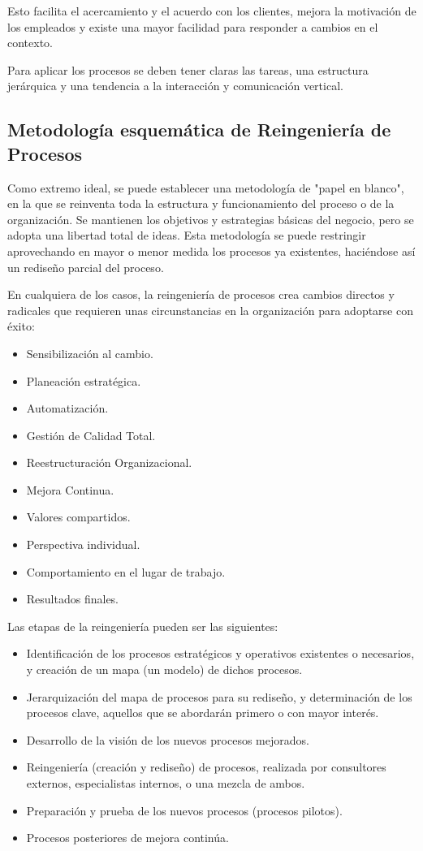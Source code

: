 Esto facilita el acercamiento y el acuerdo con los clientes, mejora la motivación de los empleados y existe
una mayor facilidad para responder a cambios en el contexto.

Para aplicar los procesos se deben tener claras las tareas, una estructura jerárquica y una tendencia a la
interacción y comunicación vertical.

\subsection*{Metodología esquemática de Reingeniería de Procesos}

Como extremo ideal, se puede establecer una metodología de "papel en blanco", en la que se reinventa toda la
estructura y funcionamiento del proceso o de la organización. Se mantienen los objetivos y estrategias básicas
del negocio, pero se adopta una libertad total de ideas. Esta metodología se puede restringir aprovechando en
mayor o menor medida los procesos ya existentes, haciéndose así un rediseño parcial del proceso.

En cualquiera de los casos, la reingeniería de procesos crea cambios directos y radicales que requieren unas
circunstancias en la organización para adoptarse con éxito:
\begin{itemize}
	\item Sensibilización al cambio.
	\item Planeación estratégica.
	\item Automatización.
	\item Gestión de Calidad Total.
	\item Reestructuración Organizacional.
	\item Mejora Continua.
	\item Valores compartidos.
	\item Perspectiva individual.
	\item Comportamiento en el lugar de trabajo.
	\item Resultados finales.
\end{itemize}
Las etapas de la reingeniería pueden ser las siguientes:
\begin{itemize}
	\item Identificación de los procesos estratégicos y operativos existentes o necesarios, y creación de un mapa (un modelo) de dichos procesos.
	\item Jerarquización del mapa de procesos para su rediseño, y determinación de los procesos clave, aquellos que se abordarán primero o con mayor interés.
	\item Desarrollo de la visión de los nuevos procesos mejorados.
	\item Reingeniería (creación y rediseño) de procesos, realizada por consultores externos, especialistas internos, o una mezcla de ambos.
	\item Preparación y prueba de los nuevos procesos (procesos pilotos).
	\item Procesos posteriores de mejora continúa.
\end{itemize}

